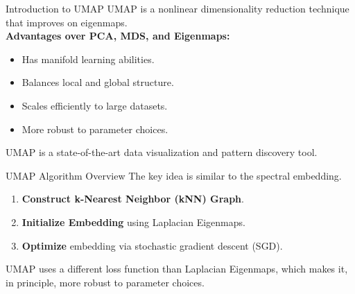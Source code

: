 \documentclass[11pt,handout,aspectratio=169]{beamer}
\begin{document}
\begin{frame}{Introduction to UMAP}
UMAP is a nonlinear dimensionality reduction technique that improves on eigenmaps.\\[4mm]
\textbf{Advantages over PCA, MDS, and Eigenmaps:}
    \begin{itemize}
    \item Has manifold learning abilities.\\[3mm]
        \item Balances local and global structure.\\[3mm]
        \item Scales efficiently to large datasets.\\[3mm]
        \item More robust to parameter choices.\\[5mm]
    \end{itemize}
UMAP is a state-of-the-art data visualization and pattern discovery tool.
\end{frame}


\begin{frame}{UMAP Algorithm Overview}
The key idea is similar to the spectral embedding.
\begin{enumerate}
    \item \textbf{Construct k-Nearest Neighbor (kNN) Graph}.\\[3mm]
    \item \textbf{Initialize Embedding} using Laplacian Eigenmaps.\\[3mm]
    \item \textbf{Optimize} embedding via stochastic gradient descent (SGD).\\[5mm]
\end{enumerate}
UMAP uses a different loss function than Laplacian Eigenmaps, which makes it, in principle, more robust to parameter choices. 
\end{frame}
\end{document}
